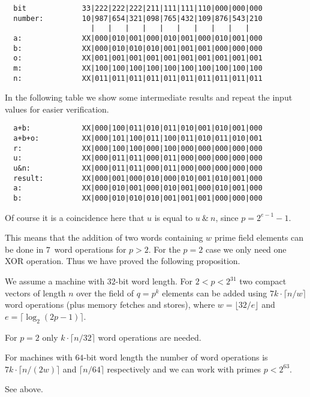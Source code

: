 \begin{verbatim}
  bit             33|222|222|222|211|111|111|110|000|000|000
  number:         10|987|654|321|098|765|432|109|876|543|210
                    |   |   |   |   |   |   |   |   |   |
  a:              XX|000|010|001|000|010|001|000|010|001|000
  b:              XX|000|010|010|010|001|001|001|000|000|000
  o:              XX|001|001|001|001|001|001|001|001|001|001
  m:              XX|100|100|100|100|100|100|100|100|100|100
  n:              XX|011|011|011|011|011|011|011|011|011|011
\end{verbatim}

In the following table we show some intermediate results and repeat
the input values for easier verification.

\begin{verbatim}
  a+b:            XX|000|100|011|010|011|010|001|010|001|000
  a+b+o:          XX|000|101|100|011|100|011|010|011|010|001
  r:              XX|000|100|100|000|100|000|000|000|000|000
  u:              XX|000|011|011|000|011|000|000|000|000|000
  u&n:            XX|000|011|011|000|011|000|000|000|000|000
  result:         XX|000|001|000|010|000|010|001|010|001|000
  a:              XX|000|010|001|000|010|001|000|010|001|000
  b:              XX|000|010|010|010|001|001|001|000|000|000
\end{verbatim}

Of course it is a coincidence here that $u$ is equal to 
$u \ \&\ n$, since $p = 2^{e-1}-1$.

This means that the addition of two words containing $w$ prime field
elements can be done in $7$~word operations for $p > 2$. For the
$p=2$ case we only need one XOR operation. Thus we have proved the
following proposition.

\begin{Prop}
\label{addvec}
We assume a machine with $32$-bit word length. For\/ $2 < p < 2^{31}$
two compact vectors of length $n$ over the field of $q=p^k$
elements can be added using $7k\cdot \lceil n/w \rceil$ word operations
(plus memory fetches and stores), where $w = \lfloor 32/e \rfloor$
and $e = \lceil \log_2(2p-1) \rceil$. 

For $p=2$ only $k \cdot \lceil n/32 \rceil$ word operations are needed.

For machines with\/ $64$-bit word length the number of word operations
is\/ $7k \cdot \lceil n/(2w) \rceil$ and $\lceil n/64 \rceil$ respectively and 
we can work with primes $p < 2^{63}$.
\end{Prop}
\Proof See above. \ProofEnd

